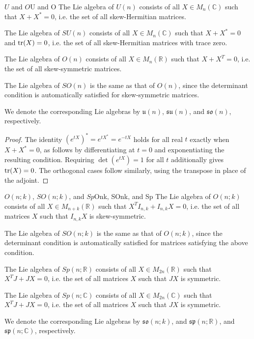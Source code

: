 \documentclass[../main.tex]{subfiles}
\begin{document}
\begin{proposition}{$U$ and $O$}{U and O}
  The Lie algebra of $U(n)$ consists of all $X \in M_n(\mathbb{C})$ such that $X + X^* = 0$, i.e. the set of all skew-Hermitian matrices.

  The Lie algebra of $SU(n)$ consists of all $X \in M_n(\mathbb{C})$ such that $X + X^* = 0$ and $\operatorname{tr}(X) = 0$, i.e. the set of all skew-Hermitian matrices with trace zero.

  The Lie algebra of $O(n)$ consists of all $X \in M_n(\mathbb{R})$ such that $X + X^T = 0$, i.e. the set of all skew-symmetric matrices.

  The Lie algebra of $SO(n)$ is the same as that of $O(n)$, since the determinant condition is automatically satisfied for skew-symmetric matrices.

  We denote the corresponding Lie algebras by $\mathfrak{u}(n)$, $\mathfrak{su}(n)$, and $\mathfrak{so}(n)$, respectively.
\end{proposition}
\begin{proof}
  The identity $(e^{tX})^*=e^{tX^*}=e^{-tX}$ holds for all real $t$ exactly when $X+X^*=0$, as follows by differentiating at $t=0$ and exponentiating the resulting condition. Requiring $\det(e^{tX})=1$ for all $t$ additionally gives $\operatorname{tr}(X)=0$. The orthogonal cases follow similarly, using the transpose in place of the adjoint.
\end{proof}

\begin{proposition}{$O(n;k)$, $SO(n;k)$, and $Sp$}{Onk, SOnk, and Sp}
  The Lie algebra of $O(n;k)$ consists of all $X \in M_{n+k}(\mathbb{R})$ such that $X^T I_{n,k} + I_{n,k} X = 0$, i.e. the set of all matrices $X$ such that $I_{n,k} X$ is skew-symmetric.

  The Lie algebra of $SO(n;k)$ is the same as that of $O(n;k)$, since the determinant condition is automatically satisfied for matrices satisfying the above condition.

  The Lie algebra of $Sp(n;\mathbb{R})$ consists of all $X \in M_{2n}(\mathbb{R})$ such that $X^T J + J X = 0$, i.e. the set of all matrices $X$ such that $J X$ is symmetric.

  The Lie algebra of $Sp(n;\mathbb{C})$ consists of all $X \in M_{2n}(\mathbb{C})$ such that $X^T J + J X = 0$, i.e. the set of all matrices $X$ such that $J X$ is symmetric.

  We denote the corresponding Lie algebras by $\mathfrak{so}(n;k)$, and $\mathfrak{sp}(n;\mathbb{R})$, and $\mathfrak{sp}(n;\mathbb{C})$, respectively.
\end{proposition}
\end{document}
